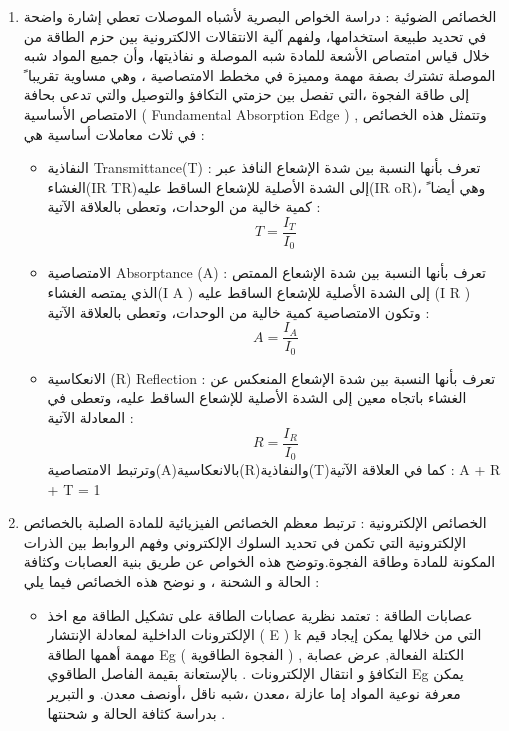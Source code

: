 \begin{enumerate}
	\item 
	الخصائص الضوئية : دراسة الخواص البصرية لأشباه الموصلات تعطي إشارة واضحة في تحديد طبيعة استخدامها، ولفهم آلية الانتقالات الالكترونية بين حزم الطاقة من خلال قياس امتصاص الأشعة للمادة شبه الموصلة و نفاذيتها، وأن جميع المواد شبه الموصلة تشترك بصفة مهمة ومميزة في مخطط الامتصاصية ، وهي مساوية تقريبا ً إلى طاقة الفجوة ،التي تفصل بين حزمتي التكافؤ والتوصيل والتي تدعى بحافة الامتصاص الأساسية ( Fundamental Absorption Edge )  , وتتمثل هذه الخصائص في ثلاث معاملات أساسية هي : 
	\begin{itemize}
		\item 
		النفاذية Transmittance(T) : تعرف بأنها النسبة بين شدة الإشعاع النافذ عبر الغشاء(IR TR)إلى الشدة الأصلية للإشعاع الساقط عليه(IR oR)، وهي أيضا ً كمية خالية من الوحدات، وتعطى بالعلاقة الآتية :  \begin{equation*} 	T = \dfrac{I_{T} }{I_{0}}\end{equation*}
		
		\item 
		الامتصاصية Absorptance (A) : تعرف بأنها النسبة بين شدة الإشعاع الممتص الذي يمتصه الغشاء(I A ) إلى الشدة الأصلية للإشعاع الساقط عليه (I R ) وتكون الامتصاصية كمية خالية من الوحدات، وتعطى بالعلاقة الآتية : \begin{equation*} 	A = \dfrac{I_{A} }{I_{0}}\end{equation*}
		\item 
		الانعكاسية (R) Reflection : تعرف بأنها النسبة بين شدة الإشعاع المنعكس عن الغشاء باتجاه معين إلى الشدة الأصلية للإشعاع الساقط عليه، وتعطى في المعادلة الآتية : \begin{equation*} 	R = \dfrac{I_{R} }{I_{0}}\end{equation*}
		وترتبط الامتصاصية(A)بالانعكاسية(R)والنفاذية(T)كما في العلاقة الآتية : A + R + T = 1
	\end{itemize}
	
	\item
	الخصائص الإلكترونية : ترتبط معظم الخصائص الفيزيائية للمادة الصلبة بالخصائص الإلكترونية التي تكمن في تحديد السلوك الإلكتروني وفهم الروابط بين الذرات المكونة للمادة وطاقة الفجوة.وتوضح هذه الخواص عن طريق بنية العصابات وكثافة الحالة و الشحنة ، و نوضح هذه الخصائص فيما يلي :
	\begin{itemize}
		\item 
		
		عصابات الطاقة : تعتمد نظرية عصابات الطاقة على تشكيل الطاقة مع اخذ الإلكترونات الداخلية لمعادلة الإنتشار ( E ) k التي من خلالها يمكن إيجاد قيم مهمة أهمها الطاقة Eg ( الفجوة الطاقوية ) , الكتلة الفعالة, عرض عصابة التكافؤ و انتقال الإلكترونات . 
		بالإستعانة بقيمة الفاصل الطاقوي Eg يمكن معرفة نوعية المواد إما عازلة ،معدن ،شبه ناقل ،أونصف معدن. و التبرير بدراسة كثافة الحالة و شحنتها .\\
		

\end{itemize}
\end{enumerate}
